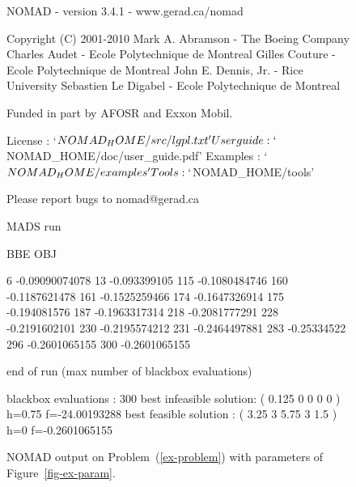 \documentclass[12pt,english]{article}
\newcommand{\nomad}{NOMAD\xspace}
\begin{document}
\begin{figure}[ht]
\begin{scriptsize}
\begin{center}
\begin{boxedverbatim}
NOMAD - version 3.4.1 - www.gerad.ca/nomad

Copyright (C) 2001-2010 {
        Mark A. Abramson     - The Boeing Company
        Charles Audet        - Ecole Polytechnique de Montreal
        Gilles Couture       - Ecole Polytechnique de Montreal
        John E. Dennis, Jr.  - Rice University
        Sebastien Le Digabel - Ecole Polytechnique de Montreal
}

Funded in part by AFOSR and Exxon Mobil.

License   : `$NOMAD_HOME/src/lgpl.txt'
User guide: `$NOMAD_HOME/doc/user_guide.pdf'
Examples  : `$NOMAD_HOME/examples'
Tools     : `$NOMAD_HOME/tools'

Please report bugs to nomad@gerad.ca

MADS run {

        BBE     OBJ

        6       -0.09090074078
        13      -0.093399105
        115     -0.1080484746
        160     -0.1187621478
        161     -0.1525259466
        174     -0.1647326914
        175     -0.194081576
        187     -0.1963317314
        218     -0.2081777291
        228     -0.2191602101
        230     -0.2195574212
        231     -0.2464497881
        283     -0.25334522
        296     -0.2601065155
        300     -0.2601065155

} end of run (max number of blackbox evaluations)

blackbox evaluations   : 300
best infeasible solution: ( 0.125 0 0 0 0 ) h=0.75 f=-24.00193288
best feasible solution  : ( 3.25 3 5.75 3 1.5 ) h=0 f=-0.2601065155
\end{boxedverbatim}
\end{center}
\end{scriptsize}
\caption{\nomad output on Problem~(\ref{ex-problem})
             with parameters of Figure~\ref{fig-ex-param}.
        }
\label{fig-ex-run}
\end{figure}
\end{document}
